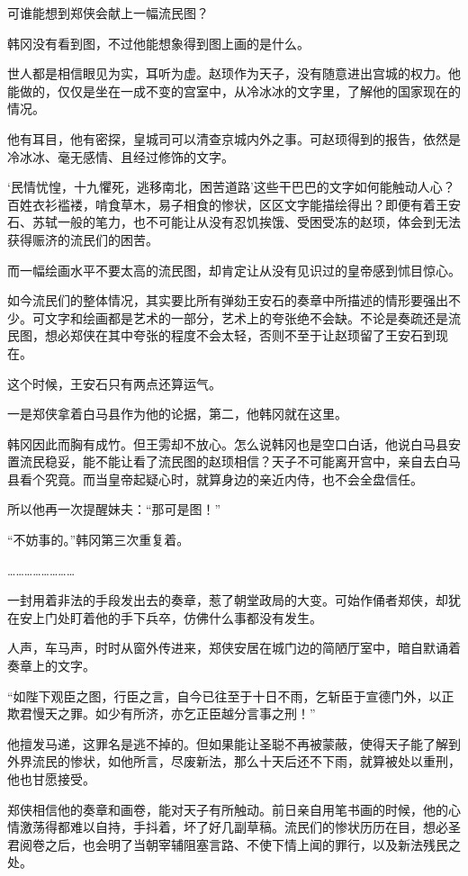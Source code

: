 可谁能想到郑侠会献上一幅流民图？

韩冈没有看到图，不过他能想象得到图上画的是什么。

世人都是相信眼见为实，耳听为虚。赵顼作为天子，没有随意进出宫城的权力。他能做的，仅仅是坐在一成不变的宫室中，从冷冰冰的文字里，了解他的国家现在的情况。

他有耳目，他有密探，皇城司可以清查京城内外之事。可赵顼得到的报告，依然是冷冰冰、毫无感情、且经过修饰的文字。

‘民情忧惶，十九懼死，逃移南北，困苦道路’这些干巴巴的文字如何能触动人心？百姓衣衫褴褛，啃食草木，易子相食的惨状，区区文字能描绘得出？即便有着王安石、苏轼一般的笔力，也不可能让从没有忍饥挨饿、受困受冻的赵顼，体会到无法获得赈济的流民们的困苦。

而一幅绘画水平不要太高的流民图，却肯定让从没有见识过的皇帝感到怵目惊心。

如今流民们的整体情况，其实要比所有弹劾王安石的奏章中所描述的情形要强出不少。可文字和绘画都是艺术的一部分，艺术上的夸张绝不会缺。不论是奏疏还是流民图，想必郑侠在其中夸张的程度不会太轻，否则不至于让赵顼留了王安石到现在。

这个时候，王安石只有两点还算运气。

一是郑侠拿着白马县作为他的论据，第二，他韩冈就在这里。

韩冈因此而胸有成竹。但王雱却不放心。怎么说韩冈也是空口白话，他说白马县安置流民稳妥，能不能让看了流民图的赵顼相信？天子不可能离开宫中，亲自去白马县看个究竟。而当皇帝起疑心时，就算身边的亲近内侍，也不会全盘信任。

所以他再一次提醒妹夫：“那可是图！”

“不妨事的。”韩冈第三次重复着。

……………………

一封用着非法的手段发出去的奏章，惹了朝堂政局的大变。可始作俑者郑侠，却犹在安上门处盯着他的手下兵卒，仿佛什么事都没有发生。

人声，车马声，时时从窗外传进来，郑侠安居在城门边的简陋厅室中，暗自默诵着奏章上的文字。

“如陛下观臣之图，行臣之言，自今已往至于十日不雨，乞斩臣于宣德门外，以正欺君慢天之罪。如少有所济，亦乞正臣越分言事之刑！”

他擅发马递，这罪名是逃不掉的。但如果能让圣聪不再被蒙蔽，使得天子能了解到外界流民的惨状，如他所言，尽废新法，那么十天后还不下雨，就算被处以重刑，他也甘愿接受。

郑侠相信他的奏章和画卷，能对天子有所触动。前日亲自用笔书画的时候，他的心情激荡得都难以自持，手抖着，坏了好几副草稿。流民们的惨状历历在目，想必圣君阅卷之后，也会明了当朝宰辅阻塞言路、不使下情上闻的罪行，以及新法残民之处。

